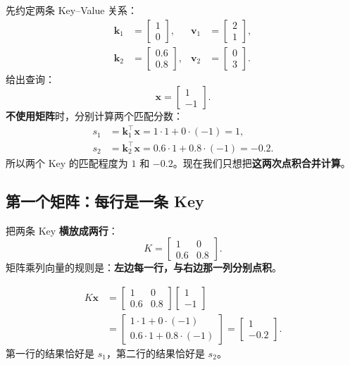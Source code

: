 \documentclass[11pt,a4paper,UTF8]{ctexart}
\numberwithin{equation}{section}
\newcommand{\vect}[1]{\boldsymbol{#1}}
\begin{document}
先约定两条 Key--Value 关系：
\begin{align*}
\vect{k}_1&=\begin{bmatrix}1\\0\end{bmatrix},
& \vect{v}_1&=\begin{bmatrix}2\\1\end{bmatrix},\\
\vect{k}_2&=\begin{bmatrix}0.6\\0.8\end{bmatrix},
& \vect{v}_2&=\begin{bmatrix}0\\3\end{bmatrix}.
\end{align*}
给出查询：
\[
\vect{x}=\begin{bmatrix}1\\-1\end{bmatrix}.
\]
\textbf{不使用矩阵}时，分别计算两个匹配分数：
\begin{align*}
s_1&=\vect{k}_1^\top\vect{x}=1\cdot1+0\cdot(-1)=1,\\
s_2&=\vect{k}_2^\top\vect{x}=0.6\cdot1+0.8\cdot(-1)=-0.2.
\end{align*}
所以两个 Key 的匹配程度为 $1$ 和 $-0.2$。现在我们只想把\textbf{这两次点积合并计算}。

\subsection{第一个矩阵：每行是一条 Key}

把两条 Key \textbf{横放成两行}：
\begin{equation}
K=\begin{bmatrix}
  1 & 0\\
  0.6 & 0.8
\end{bmatrix}.
\end{equation}
矩阵乘列向量的规则是：\textbf{左边每一行，与右边那一列分别点积}。

\begin{example}[title={用一行乘一列，亲手算两次}]
\begin{align*}
K\vect{x}
&=\begin{bmatrix}1&0\\0.6&0.8\end{bmatrix}
  \begin{bmatrix}1\\-1\end{bmatrix}\\
&=\begin{bmatrix}
1\cdot1+0\cdot(-1)\\
0.6\cdot1+0.8\cdot(-1)
\end{bmatrix}
=\boxed{\begin{bmatrix}1\\-0.2\end{bmatrix}}.
\end{align*}
第一行的结果恰好是 $s_1$，第二行的结果恰好是 $s_2$。
\end{example}
\end{document}
